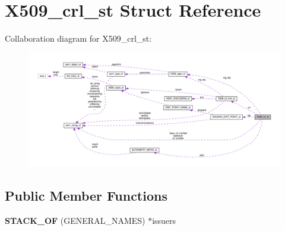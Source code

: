 \hypertarget{structX509__crl__st}{}\section{X509\+\_\+crl\+\_\+st Struct Reference}
\label{structX509__crl__st}


Collaboration diagram for X509\+\_\+crl\+\_\+st\+:
\nopagebreak
\begin{figure}[H]
\begin{center}
\leavevmode
\includegraphics[width=350pt]{structX509__crl__st__coll__graph}
\end{center}
\end{figure}
\subsection*{Public Member Functions}
\begin{DoxyCompactItemize}
\item 
\mbox{\label{structX509__crl__st_af37f4e1a53865648212087fd65206bb6}} 
{\bfseries S\+T\+A\+C\+K\+\_\+\+OF} (G\+E\+N\+E\+R\+A\+L\+\_\+\+N\+A\+M\+ES) $\ast$issuers
\end{DoxyCompactItemize}
